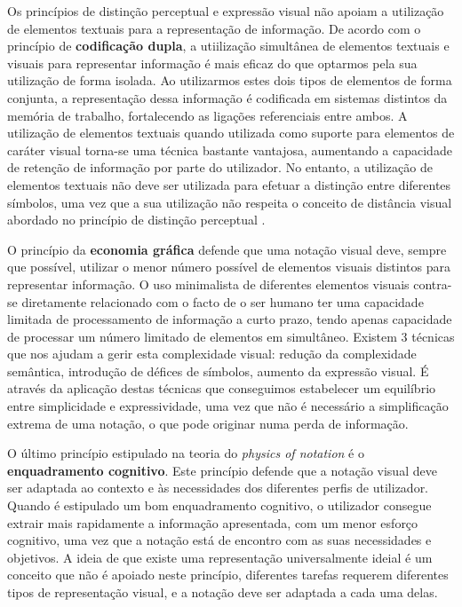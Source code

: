 Os princípios de distinção perceptual e expressão visual não apoiam a utilização de elementos textuais para a representação de informação. De acordo com o princípio de \textbf{codificação dupla}, a utiilização simultânea de elementos textuais e visuais para representar informação é mais eficaz do que optarmos pela sua utilização de forma isolada. Ao utilizarmos estes dois tipos de elementos de forma conjunta, a representação dessa informação é codificada em sistemas distintos da memória de trabalho, fortalecendo as ligações referenciais entre ambos. A utilização de elementos textuais quando utilizada como suporte para elementos de caráter visual torna-se uma técnica bastante vantajosa, aumentando a capacidade de retenção de informação por parte do utilizador. No entanto, a utilização de elementos textuais não deve ser utilizada para efetuar a distinção entre diferentes símbolos, uma vez que a sua utilização não respeita o conceito de distância visual abordado no princípio de distinção perceptual \cite{moody2009physics}. 

O princípio da \textbf{economia gráfica} defende que uma notação visual deve, sempre que possível, utilizar o menor número possível de elementos visuais distintos para representar informação. O uso minimalista de diferentes elementos visuais contra-se diretamente relacionado com o facto de o ser humano ter uma capacidade limitada de processamento de informação a curto prazo, tendo apenas capacidade de processar um número limitado de elementos em simultâneo. Existem 3 técnicas que nos ajudam a gerir esta complexidade visual: redução da complexidade semântica, introdução de défices de símbolos, aumento da expressão visual. É através da aplicação destas técnicas que conseguimos estabelecer um equilíbrio entre simplicidade e expressividade, uma vez que não é necessário a simplificação extrema de uma notação, o que pode originar numa perda de informação.

O último princípio estipulado na teoria do \textit{physics of notation} é o \textbf{enquadramento cognitivo}. Este princípio defende que a notação visual deve ser adaptada ao contexto e às necessidades dos diferentes perfis de utilizador. Quando é estipulado um bom enquadramento cognitivo, o utilizador consegue extrair mais rapidamente a informação apresentada, com um menor esforço cognitivo, uma vez que a notação está de encontro com as suas necessidades e objetivos. A ideia de que existe uma representação universalmente ideial é um conceito que não é apoiado neste princípio, diferentes tarefas requerem diferentes tipos de representação visual, e a notação deve ser adaptada a cada uma delas. 

